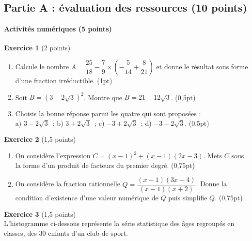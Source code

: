 \subsection*{Partie A : évaluation des ressources (10 points)}

\paragraph{Activités numériques (5 points)}

\textbf{Exercice 1} (2 points)
\begin{enumerate}[label=\arabic*)]
\item Calcule le nombre $A=\dfrac{25}{18}-\dfrac79\times\left(-\dfrac5{14}+\dfrac8{21}\right)$
et donne le résultat sous forme d'une fraction irréductible. \hfill (1pt)
\item Soit $B=(3-2\sqrt3)^{2}$. Montre que $B=21-12\sqrt3$. \hfill (0,5pt)
\item Choisis la bonne réponse parmi les quatre qui sont proposées : \\
a) $3-2\sqrt3$~; \quad b) $3+2\sqrt3$~; \quad c) $-3+2\sqrt3$~; \quad d) $-3-2\sqrt3$.
\hfill (0,5pt)
\end{enumerate}

\textbf{Exercice 2} (1,5 points)
\begin{enumerate}[label=\arabic*)]
\item On considère l'expression $C=(x-1)^{2}+(x-1)(2x-3)$. Mets $C$ sous la forme d'un
produit de facteurs du premier degré. \hfill (0,75pt)
\item On considère la fraction rationnelle $Q=\dfrac{(x-1)(3x-4)}{(x-1)(x+2)}$. Donne la
condition d'existence d'une valeur numérique de $Q$ puis simplifie $Q$. \hfill (0,75pt)
\end{enumerate}

\textbf{Exercice 3} (1,5 points) \\
L'histogramme ci-dessous représente la série statistique des âges regroupés en classes,
des $30$ enfants d'un club de sport.

